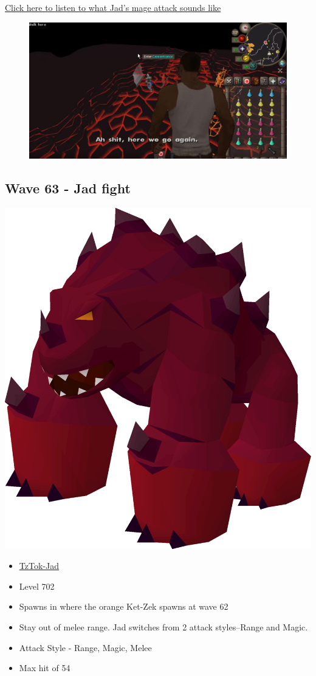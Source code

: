 \documentclass{article}
\begin{document}
    \vspace{2mm}
\href{https://oldschool.runescape.wiki/index.php?title=File\%3ATzTok-Jad_Magic_attack.ogg}
    {Click here to listen to what Jad's mage attack sounds like}
    \begin{figure}[b!]
        \centering
        \includegraphics[scale = .2 ]{ahshit.jpg}
    \end{figure}
\newpage
\begin{center}
\section{Wave 63 - Jad fight}
\end{center}

\begin{multicols}{2}
  \null \vfill
  \includegraphics[width=.3\textwidth]{jad.png}
  \vfill \null
\columnbreak
  \null \vfill
  \begin{itemize}
    \item \underline{TzTok-Jad}
    \item Level 702
    \item Spawns in where the orange Ket-Zek spawns at wave 62 
    \item Stay out of melee range. Jad switches from 2 attack styles--Range and Magic.
    \item Attack Style - Range, Magic, Melee
    \item Max hit of 54
  \end{itemize}
  \vfill \null
\end{multicols}
\end{document}
